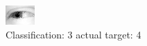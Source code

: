 \begin{figure}[h!]
\begin{center}
\includegraphics[width=0.60\columnwidth]{figures/ID2492_class_3_target_4.png}
\end{center}
\caption{ Classification: 3 actual target: 4}
\label{fig:ID2492_class_3_target_4}
\end{figure}
